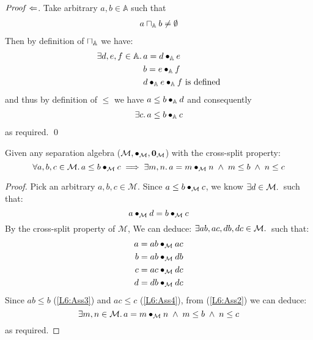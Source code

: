 \begin{lemma}[]
\noindent$\mathit{Proof} \Leftarrow$. Take arbitrary $a, b \in \mathbb{A}$ such that 
%
\begin{align*}
	a \sqcap_{\mathbb{A}}	b \not= \emptyset
\end{align*}
%
Then by definition of $\sqcap_{\mathbb{A}}$ we have: 
%
\begin{align*}
	\exists d, e, f \in \mathbb{A}.\, & a = d \bullet_{\mathbb{A}} e\\
	& b = e \bullet_{\mathbb{A}} f \\
	& d \bullet_{\mathbb{A}} e \bullet_{\mathbb{A}} f \text{ is defined}
\end{align*}
% 
and thus by definition of $\leq$ we have $a \leq b \bullet_{\mathbb{A}} d$ and consequently
%
\begin{align*}
	\exists c.\, a \leq b \bullet_{\mathbb{A}} c
\end{align*}
%
as required.
\qed
\end{lemma}
%
%
\begin{lemma}[]\label{lem:divideUpper}
%
Given any separation algebra ($\mathcal{M}, \bullet_{\mathcal{M}}, \mathbf{0}_{\mathcal{M}}$) with the cross-split property:
\[
	\forall a, b, c \in \mathcal{M}.\, a \leq b \bullet_{\mathcal{M}} c \implies \exists m, n.\, a = m \bullet_{\mathcal{M}} n \;\land\; m \leq b \;\land\; n \leq c
\]
%
\begin{proof}
Pick an arbitrary $a, b, c \in \mathcal{M}$. Since $a \leq b \bullet_{\mathcal{M}} c$, we know $\exists d \in \mathcal{M}.\,$ such that:
%
\begin{equation}
	a \bullet_{\mathcal{M}} d = b \bullet_{\mathcal{M}} c \label{L6:Ass1}
\end{equation}
%
By the cross-split property of $\mathcal{M}$, We can deduce: $\exists ab, ac, db, dc \in \mathcal{M}.\,$ such that:
%
\begin{align}
	a = ab \bullet_{\mathcal{M}} ac \label{L6:Ass2}\\
	b = ab \bullet_{\mathcal{M}} db \label{L6:Ass3}\\
	c = ac \bullet_{\mathcal{M}} dc \label{L6:Ass4}\\
	d = db \bullet_{\mathcal{M}} dc \nonumber 
\end{align}
%
Since $ab \leq b$ (\ref{L6:Ass3}) and $ac \leq c$ (\ref{L6:Ass4}), from (\ref{L6:Ass2}) we can deduce:
%
\begin{equation}
	\exists m, n \in \mathcal{M}.\, a = m \bullet_{\mathcal{M}} n \;\land\; m \leq b \;\land\; n \leq c \nonumber
\end{equation}
%
as required.
\end{proof}
\end{lemma}
